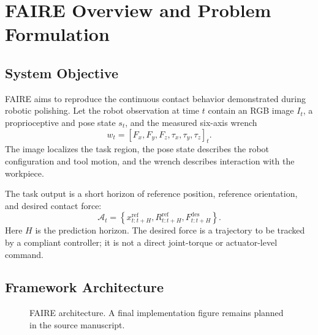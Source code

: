 \chapter{FAIRE Overview and Problem Formulation}
\label{chap:faire_overview}

\section{System Objective}
FAIRE aims to reproduce the continuous contact behavior demonstrated during robotic polishing. Let the robot observation at time \(t\) contain an RGB image \(I_t\), a proprioceptive and pose state \(s_t\), and the measured six-axis wrench
\begin{equation}
  w_t=[F_x,F_y,F_z,\tau_x,\tau_y,\tau_z]_t.
  \label{eq:wrench}
\end{equation}
The image localizes the task region, the pose state describes the robot configuration and tool motion, and the wrench describes interaction with the workpiece.

The task output is a short horizon of reference position, reference orientation, and desired contact force:
\begin{equation}
  \mathcal{A}_t =
  \left\{
    x^{\mathrm{ref}}_{t:t+H},
    R^{\mathrm{ref}}_{t:t+H},
    F^{\mathrm{des}}_{t:t+H}
  \right\}.
  \label{eq:faire_action}
\end{equation}
Here \(H\) is the prediction horizon. The desired force is a trajectory to be tracked by a compliant controller; it is not a direct joint-torque or actuator-level command.

\section{Framework Architecture}
\begin{figure}[t]
  \centering
  \caption{FAIRE architecture. A final implementation figure remains planned in the source manuscript.}
  \label{fig:faire_overview}
\end{figure}

